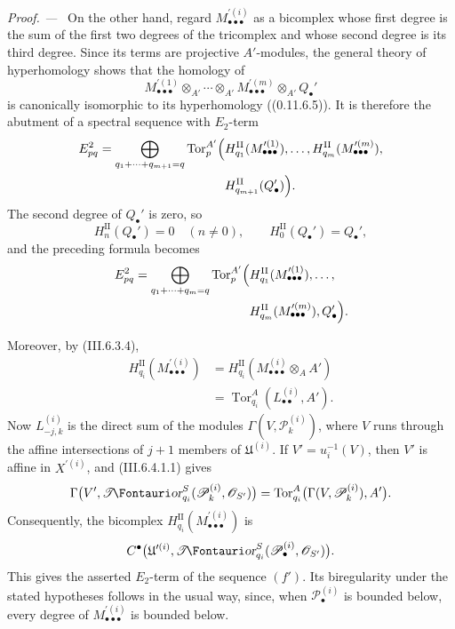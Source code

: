 \documentclass[10pt,oneside]{book}
\newcommand{\sh}[1]{\mathscr{#1}}
\newcommand{\shTor}{\sh{T}\textup{\kern-2.2pt{\Fontauri\slshape or}}}
\newcommand{\Tor}{\operatorname{Tor}}
\newcommand{\sref}[2][]{(#2)}
\newenvironment{proof}{\par\medskip\noindent\textit{Proof. ---\ }}{\par}
\begin{document}
\begin{proof}
On the other hand, regard
$M_{\bullet\bullet\bullet}^{\prime(i)}$ as a bicomplex whose first
degree is the sum of the first two degrees of the tricomplex and
whose second degree is its third degree.  Since its terms are
projective $A'$-modules, the general theory of hyperhomology shows
that the homology of
\[
  M_{\bullet\bullet\bullet}^{\prime(1)}
  \otimes_{A'}\cdots\otimes_{A'}
  M_{\bullet\bullet\bullet}^{\prime(m)}
  \otimes_{A'}Q_\bullet'
\]
is canonically isomorphic to its hyperhomology
(\sref[0]{0.11.6.5}).  It is therefore the abutment of a spectral
sequence with $E_2$-term
\[
\begin{split}
  E_{pq}^2
  =
  \bigoplus_{q_1+\cdots+q_{m+1}=q}
  \Tor_p^{A'}
  \Bigl(
    &
    H_{q_1}^{\mathrm{II}}
    (M_{\bullet\bullet\bullet}^{\prime(1)}),\ldots,
    H_{q_m}^{\mathrm{II}}
    (M_{\bullet\bullet\bullet}^{\prime(m)}),
    \\
    &
    H_{q_{m+1}}^{\mathrm{II}}(Q_\bullet')
  \Bigr).
\end{split}
\]
The second degree of $Q_\bullet'$ is zero, so
\[
  H_n^{\mathrm{II}}(Q_\bullet')=0
  \quad(n\neq0),
  \qquad
  H_0^{\mathrm{II}}(Q_\bullet')=Q_\bullet',
\]
and the preceding formula becomes
\[
\begin{split}
  E_{pq}^2
  =
  \bigoplus_{q_1+\cdots+q_m=q}
  \Tor_p^{A'}
  \Bigl(
    &
    H_{q_1}^{\mathrm{II}}
    (M_{\bullet\bullet\bullet}^{\prime(1)}),\ldots,
    \\
    &
    H_{q_m}^{\mathrm{II}}
    (M_{\bullet\bullet\bullet}^{\prime(m)}),
    Q_\bullet'
  \Bigr).
\end{split}
\]

Moreover, by \sref{III.6.3.4},
\[
\begin{split}
  H_{q_i}^{\mathrm{II}}
  (M_{\bullet\bullet\bullet}^{\prime(i)})
  &=
  H_{q_i}^{\mathrm{II}}
  (M_{\bullet\bullet\bullet}^{(i)}\otimes_AA')
  \\
  &=
  \Tor_{q_i}^A(L_{\bullet\bullet}^{(i)},A').
\end{split}
\]
Now $L_{-j,k}^{(i)}$ is the direct sum of the modules
$\Gamma(V,\sh P_k^{(i)})$, where $V$ runs through the affine
intersections of $j+1$ members of $\mathfrak U^{(i)}$.  If
$V'=u_i^{-1}(V)$, then $V'$ is affine in $X^{\prime(i)}$, and
\sref{III.6.4.1.1} gives
\[
  \Gamma
  \bigl(
    V',
    \shTor_{q_i}^S
    (\sh P_k^{(i)},\sh O_{S'})
  \bigr)
  =
  \Tor_{q_i}^A
  \bigl(
    \Gamma(V,\sh P_k^{(i)}),A'
  \bigr).
\]
Consequently, the bicomplex
$H_{q_i}^{\mathrm{II}}
(M_{\bullet\bullet\bullet}^{\prime(i)})$
is
\[
  C^\bullet
  \bigl(
    \mathfrak U^{\prime(i)},
    \shTor_{q_i}^S
    (\sh P_\bullet^{(i)},\sh O_{S'})
  \bigr).
\]
This gives the asserted $E_2$-term of the sequence $(f')$.  Its
biregularity under the stated hypotheses follows in the usual way,
since, when $\sh P_\bullet^{(i)}$ is bounded below, every degree of
$M_{\bullet\bullet\bullet}^{\prime(i)}$ is bounded below.
\end{proof}
\end{document}
